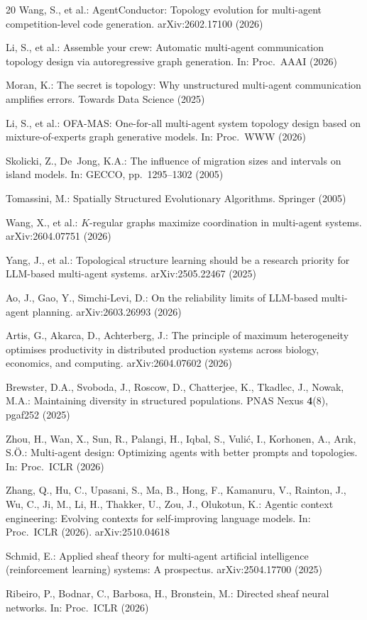 \documentclass[runningheads]{llncs}
\begin{document}
\begin{thebibliography}{20}
Wang, S., et al.:
AgentConductor: Topology evolution for multi-agent competition-level
code generation.
arXiv:2602.17100 (2026)

Li, S., et al.:
Assemble your crew: Automatic multi-agent communication topology
design via autoregressive graph generation.
In: Proc.\ AAAI (2026)

Moran, K.:
The secret is topology: Why unstructured multi-agent communication
amplifies errors.
Towards Data Science (2025)

Li, S., et al.:
OFA-MAS: One-for-all multi-agent system topology design based on
mixture-of-experts graph generative models.
In: Proc.\ WWW (2026)

Skolicki, Z., De~Jong, K.A.:
The influence of migration sizes and intervals on island models.
In: GECCO, pp.\ 1295--1302 (2005)

Tomassini, M.:
Spatially Structured Evolutionary Algorithms.
Springer (2005)

Wang, X., et al.:
$K$-regular graphs maximize coordination in multi-agent systems.
arXiv:2604.07751 (2026)

Yang, J., et al.:
Topological structure learning should be a research priority for
{LLM}-based multi-agent systems.
arXiv:2505.22467 (2025)

Ao, J., Gao, Y., Simchi-Levi, D.:
On the reliability limits of {LLM}-based multi-agent planning.
arXiv:2603.26993 (2026)

Artis, G., Akarca, D., Achterberg, J.:
The principle of maximum heterogeneity optimises productivity in
distributed production systems across biology, economics, and computing.
arXiv:2604.07602 (2026)

Brewster, D.A., Svoboda, J., Roscow, D., Chatterjee, K., Tkadlec, J., Nowak, M.A.:
Maintaining diversity in structured populations.
PNAS Nexus \textbf{4}(8), pgaf252 (2025)

Zhou, H., Wan, X., Sun, R., Palangi, H., Iqbal, S., Vuli{\'c}, I., Korhonen, A., Ar{\i}k, S.{\"O}.:
Multi-agent design: Optimizing agents with better prompts and topologies.
In: Proc.\ ICLR (2026)

Zhang, Q., Hu, C., Upasani, S., Ma, B., Hong, F., Kamanuru, V., Rainton, J., Wu, C., Ji, M., Li, H., Thakker, U., Zou, J., Olukotun, K.:
Agentic context engineering: Evolving contexts for self-improving language models.
In: Proc.\ ICLR (2026).
arXiv:2510.04618

Schmid, E.:
Applied sheaf theory for multi-agent artificial intelligence (reinforcement
learning) systems: A prospectus.
arXiv:2504.17700 (2025)

Ribeiro, P., Bodnar, C., Barbosa, H., Bronstein, M.:
Directed sheaf neural networks.
In: Proc.\ ICLR (2026)

\end{thebibliography}
\end{document}
